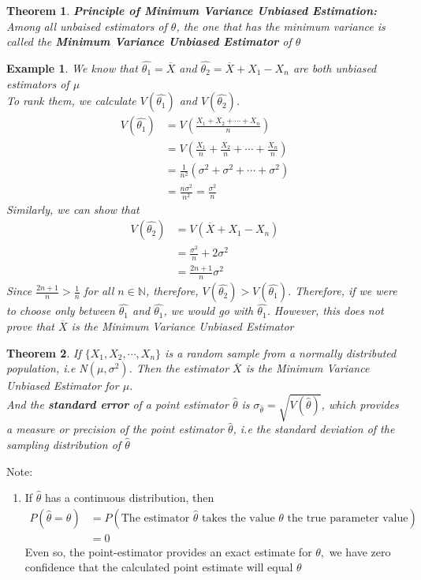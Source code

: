 \documentclass[11pt,oneside]{book}
\theoremstyle{newStyle}
\newtheorem{thm}{Theorem}[chapter]
\newtheorem{ex}{Example}[section]
\newcommand{\N}{\mathbb{N}}
\newcommand{\note}{\color{red}Note: \color{black}}
\begin{document}
\begin{thm}
\textbf{Principle of Minimum Variance Unbiased Estimation:}\\
Among all unbaised estimators of $\theta$,  the one that has the minimum variance is called the \textbf{Minimum Variance Unbiased Estimator} of $\theta$
\end{thm}
\begin{ex}
We know that $\widehat{\theta_1}=\overline{X}$ and $\widehat{\theta_2}=\overline{X}+X_1-X_n$ are both unbiased estimators of $\mu$\\
To rank them, we calculate $V(\widehat{\theta_1})$ and $V(\widehat{\theta_2})$. \begin{align*}
V(\widehat{\theta_1})&=V\left(\frac{X_1+X_2+\cdots+X_n}{n} \right)\\
&=V\left(\frac{X_1}{n}+\frac{X_2}{n}+\cdots+\frac{X_n}{n}\right)\\
&=\frac{1}{n^2}\left(\sigma^2+\sigma^2+\cdots+\sigma^2 \right)\\
&=\frac{n\sigma^2}{n^2}=\frac{\sigma^2}{n}
\end{align*}
Similarly, we can show that \begin{align*}
V(\widehat{\theta_2})&=V(\overline{X}+X_1-X_n)\\
&=\frac{\sigma^2}{n}+2\sigma^2\\
&=\frac{2n+1}{n}\sigma^2
\end{align*}
Since $\frac{2n+1}{n}>\frac{1}{n}$ for all $n\in \N$, therefore, $V(\widehat{\theta_2})>V(\widehat{\theta_1})$. Therefore, if we were to choose only between $\widehat{\theta_1}$ and $\widehat{\theta_1}$, we would go with $\widehat{\theta_1}$. However, this does not prove that $\overline{X}$ is the Minimum Variance Unbiased Estimator
\end{ex}
\begin{thm}
If $\{X_1,X_2,\cdots,X_n\}$ is a random sample from a normally distributed population, i.e N$(\mu,\sigma^2)$. Then the estimator $\overline{X}$ is the  Minimum Variance Unbiased Estimator for $\mu$.\\
And the \textbf{standard error} of a point estimator $\widehat{\theta}$ is $\sigma_{\widehat{\theta}}=\sqrt{V(\widehat{\theta})}$, which provides a measure or precision of the point estimator $\widehat{\theta}$, i.e the standard deviation of the sampling distribution of $\widehat{\theta}$
\end{thm}
\note \begin{enumerate}
\item If $\widehat{\theta}$ has a continuous distribution, then \begin{align*}
P(\widehat{\theta}=\theta)&=P(\text{The estimator }\widehat{\theta}\text{ takes the value }\theta \text{ the true parameter value})\\
&=0
\end{align*}
Even so, the point-estimator provides an exact estimate for $\theta,$ we have zero confidence that the calculated point estimate will equal $\theta$
\end{enumerate}
\end{document}
